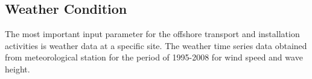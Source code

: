 \subsection{Weather Condition}

The most important input parameter for the offshore transport and installation activities is weather data at a specific site. The weather time series data obtained from meteorological station for the period of 1995-2008 for wind speed and wave height. 